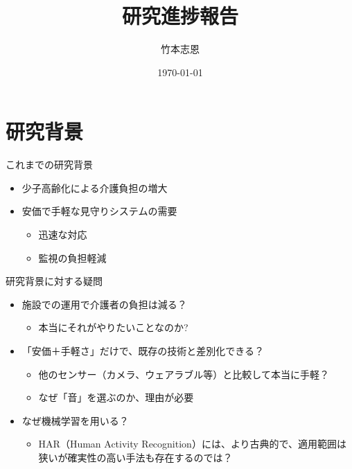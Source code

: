 \documentclass[unicode,12pt,aspectratio=169,dvipdfmx]{beamer}
\title{\textbf{研究進捗報告}}
\author{竹本志恩}
\date{\today}
\begin{document}
\begin{frame}
  \titlepage
\end{frame}

\section{研究背景}
\begin{frame}{これまでの研究背景}
    \begin{itemize}
        \item 少子高齢化による介護負担の増大
        \item 安価で手軽な見守りシステムの需要
        \begin{itemize}
            \item 迅速な対応
            \item 監視の負担軽減
        \end{itemize}
    \end{itemize}
\end{frame}

\begin{frame}{研究背景に対する疑問}
  \begin{itemize}
    \item 施設での運用で介護者の負担は減る？
    \begin{itemize}
        \item 本当にそれがやりたいことなのか?
    \end{itemize}
    \item 「安価＋手軽さ」だけで、既存の技術と差別化できる？
    \begin{itemize}
        \item 他のセンサー（カメラ、ウェアラブル等）と比較して本当に手軽？
        \item なぜ「音」を選ぶのか、理由が必要
    \end{itemize}
    \item なぜ機械学習を用いる？
    \begin{itemize}
        \item HAR（Human Activity Recognition）には、より古典的で、適用範囲は狭いが確実性の高い手法も存在するのでは？
    \end{itemize}
  \end{itemize}
\end{frame}
\end{document}
